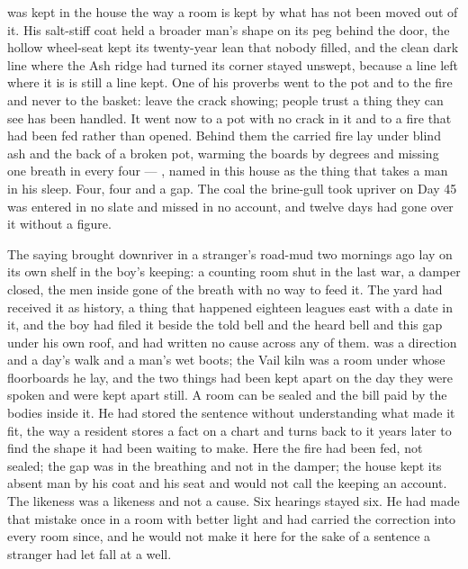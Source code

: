  was kept in the house the way a room is kept by what has not been moved out of it. His salt-stiff coat held a broader man's shape on its peg behind the door, the hollow wheel-seat kept its twenty-year lean that nobody filled, and the clean dark line where the Ash ridge had turned its corner stayed unswept, because a line left where it is is still a line kept. One of his proverbs went to the pot and to the fire and never to the basket: leave the crack showing; people trust a thing they can see has been handled. It went now to a pot with no crack in it and to a fire that had been fed rather than opened. Behind them the carried fire lay under blind ash and the back of a broken pot, warming the boards by degrees and missing one breath in every four --- , named in this house as the thing that takes a man in his sleep. Four, four and a gap. The coal the brine-gull took upriver on Day 45 was entered in no slate and missed in no account, and twelve days had gone over it without a figure.

The saying brought downriver in a stranger's road-mud two mornings ago lay on its own shelf in the boy's keeping: a counting room shut in the last war, a damper closed, the men inside gone of the breath with no way to feed it. The yard had received it as history, a thing that happened eighteen leagues east with a date in it, and the boy had filed it beside the told bell and the heard bell and this gap under his own roof, and had written no cause across any of them.  was a direction and a day's walk and a man's wet boots; the Vail kiln was a room under whose floorboards he lay, and the two things had been kept apart on the day they were spoken and were kept apart still. A room can be sealed and the bill paid by the bodies inside it. He had stored the sentence without understanding what made it fit, the way a resident stores a fact on a chart and turns back to it years later to find the shape it had been waiting to make. Here the fire had been fed, not sealed; the gap was in the breathing and not in the damper; the house kept its absent man by his coat and his seat and would not call the keeping an account. The likeness was a likeness and not a cause. Six hearings stayed six. He had made that mistake once in a room with better light and had carried the correction into every room since, and he would not make it here for the sake of a sentence a stranger had let fall at a well.

